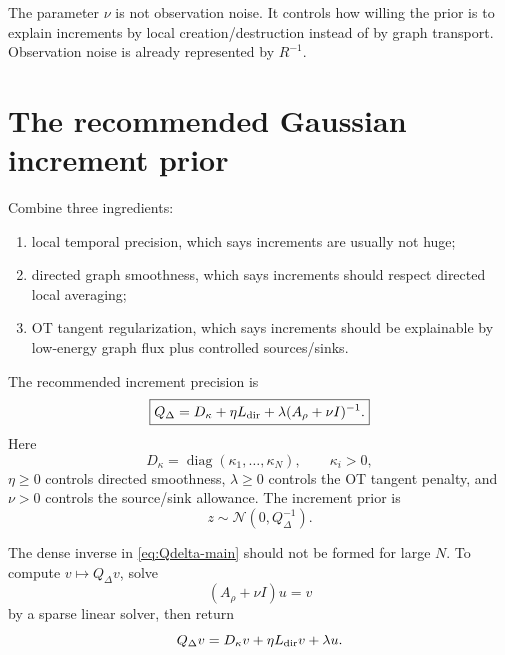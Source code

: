 \documentclass[11pt]{article}
\numberwithin{equation}{section}
\newcommand{\diag}{\operatorname{diag}}
\begin{document}
\begin{warningbox}[Meaning of $\nu$]
The parameter $\nu$ is not observation noise.  It controls how willing the prior is to explain increments by local creation/destruction instead of by graph transport.  Observation noise is already represented by $R^{-1}$.
\end{warningbox}

\section{The recommended Gaussian increment prior}
\label{sec:recommended-prior}

Combine three ingredients:
\begin{enumerate}[leftmargin=2em]
  \item local temporal precision, which says increments are usually not huge;
  \item directed graph smoothness, which says increments should respect directed local averaging;
  \item OT tangent regularization, which says increments should be explainable by low-energy graph flux plus controlled sources/sinks.
\end{enumerate}
The recommended increment precision is
\begin{equation}
  \boxed{
  Q_\Delta
  =D_\kappa+\eta L_{\rm dir}+\lambda(A_\rho+\nu I)^{-1}.}
  \label{eq:Qdelta-main}
\end{equation}
Here
\begin{equation}
  D_\kappa=\diag(\kappa_1,\ldots,\kappa_N),
  \qquad
  \kappa_i>0,
  \label{eq:Dkappa}
\end{equation}
$\eta\ge0$ controls directed smoothness, $\lambda\ge0$ controls the OT tangent penalty, and $\nu>0$ controls the source/sink allowance.  The increment prior is
\begin{equation}
  z\sim\mathcal N(0,Q_\Delta^{-1}).
  \label{eq:z-prior-final}
\end{equation}

The dense inverse in \eqref{eq:Qdelta-main} should not be formed for large $N$.  To compute $v\mapsto Q_\Delta v$, solve
\begin{equation}
  (A_\rho+\nu I)u=v
  \label{eq:A-solve}
\end{equation}
by a sparse linear solver, then return
\begin{equation}
  Q_\Delta v=D_\kappa v+\eta L_{\rm dir}v+\lambda u.
  \label{eq:Qdelta-matvec}
\end{equation}
\end{document}
